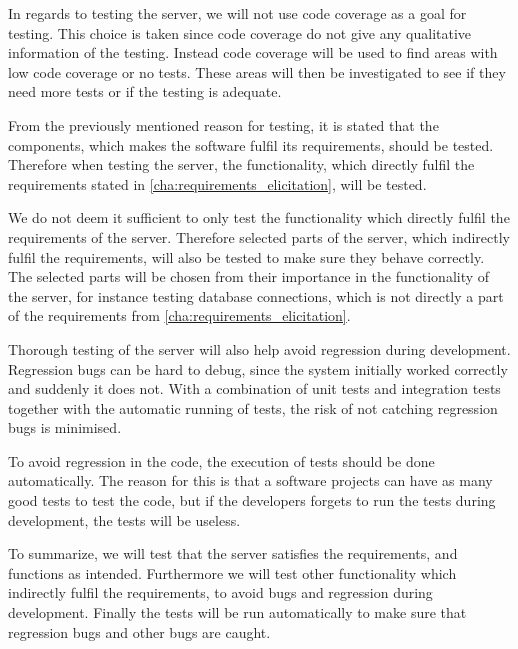 In regards to testing the server, we will not use code coverage as a goal for testing.
This choice is taken since code coverage do not give any qualitative information of the testing.
Instead code coverage will be used to find areas with low code coverage or no tests.
These areas will then be investigated to see if they need more tests or if the testing is adequate.

From the previously mentioned reason for testing,
it is stated that the components, which makes the software fulfil its requirements, should be tested.
Therefore when testing the server, the functionality,
which directly fulfil the requirements stated in \cref{cha:requirements_elicitation}, will be tested.

We do not deem it sufficient to only test the functionality which directly fulfil the requirements of the server.
Therefore selected parts of the server, which indirectly fulfil the requirements,
will also be tested to make sure they behave correctly.
The selected parts will be chosen from their importance in the functionality of the server,
for instance testing database connections,
which is not directly a part of the requirements from \cref{cha:requirements_elicitation}.


Thorough testing of the server will also help avoid regression during development.
Regression bugs can be hard to debug, since the system initially worked correctly and suddenly it does not.
With a combination of unit tests and integration tests together with the automatic running of tests,
the risk of not catching regression bugs is minimised\cite{regression}.

To avoid regression in the code, the execution of tests should be done automatically.
The reason for this is that a software projects can have as many good tests to test the code,
but if the developers forgets to run the tests during development,
the tests will be useless.

\bigskip
To summarize, we will test that the server satisfies the requirements,
and functions as intended.
Furthermore we will test other functionality which indirectly fulfil the requirements,
to avoid bugs and regression during development.
Finally the tests will be run automatically to make sure that regression bugs and other bugs are caught.

